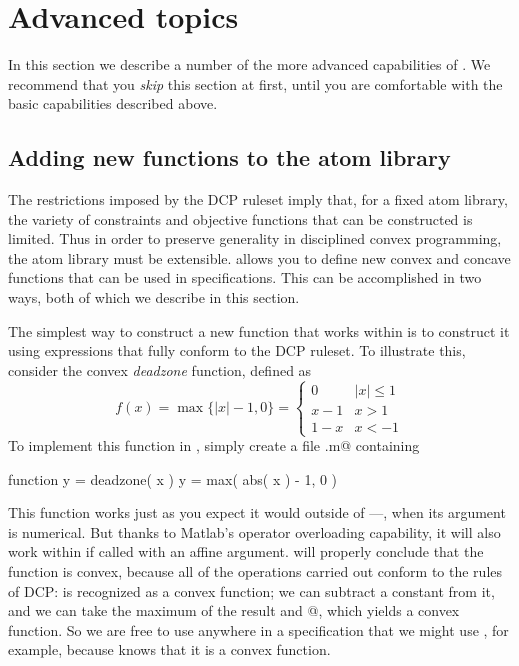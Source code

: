 \documentclass[12pt]{article}
\begin{document}
\section{Advanced topics}

In this section we describe a number of the more advanced capabilities of \cvx.
We recommend that you \emph{skip} this section at first, until you are comfortable
with the basic capabilities described above.

\subsection{Adding new functions to the \cvx atom library}
\label{s-new-fcts}

The restrictions imposed by the DCP ruleset imply that,
for a fixed atom library, the variety of constraints and objective 
functions that can be constructed is limited.
Thus in order to preserve generality in
disciplined convex programming, the atom library must be extensible.
\cvx allows
you to define new convex and concave functions
that can be used in \cvx specifications.
This can be accomplished in two ways, both of
which we describe in this section.

The simplest way to construct a new function that works within \cvx
is to construct it using expressions that fully conform to the DCP
ruleset.
To illustrate this, consider the convex \emph{deadzone} function,
defined as
\[
f(x) = \max \{ |x|-1, 0 \} =
\left\{ \begin{array}{ll}
0 & |x| \leq 1\\
x-1 & x > 1\\
1-x & x <-1
\end{array}\right.
\]
To implement this function in \cvx, simply create a file \verb@deadzone.m@
containing
\begin{code}
	function y = deadzone( x )
	y = max( abs( x ) - 1, 0 )
\end{code}
This function works just as you expect it would outside of \cvx---\ie,
when its argument is numerical. But thanks to Matlab's operator
overloading capability, it will also work within \cvx if called with an affine
argument. \cvx will properly conclude that the function is convex,
because all of the operations
carried out conform to the rules of DCP:
\verb@abs@ is recognized as a convex function; we can subtract 
a constant from it, and we can take the maximum of the result and 
@, which yields a convex function. So we are free
to use \verb@deadzone@ anywhere in a \cvx specification that we might
use \verb@abs@, for example,
because \cvx knows that it is a convex function.
\end{document}
